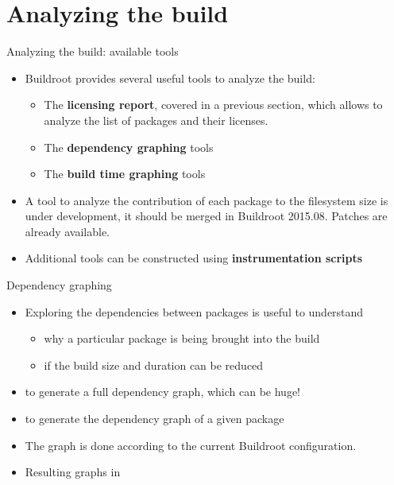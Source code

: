
\section{Analyzing the build}

\begin{frame}{Analyzing the build: available tools}
  \begin{itemize}
  \item Buildroot provides several useful tools to analyze the build:
    \begin{itemize}
    \item The {\bf licensing report}, covered in a previous section,
      which allows to analyze the list of packages and their licenses.
    \item The {\bf dependency graphing} tools
    \item The {\bf build time graphing} tools
    \end{itemize}
  \item A tool to analyze the contribution of each package to the
    filesystem size is under development, it should be merged in
    Buildroot 2015.08. Patches are already available.
  \item Additional tools can be constructed using {\bf instrumentation
      scripts}
  \end{itemize}
\end{frame}

\begin{frame}{Dependency graphing}
  \begin{itemize}
  \item Exploring the dependencies between packages is useful to
    understand
    \begin{itemize}
    \item why a particular package is being brought into the
      build
    \item if the build size and duration can be reduced
    \end{itemize}
  \item {} to generate a full dependency graph,
    which can be huge!
  \item {} to generate the dependency
    graph of a given package
  \item The graph is done according to the current Buildroot
    configuration.
  \item Resulting graphs in 
  \end{itemize}
\end{frame}


